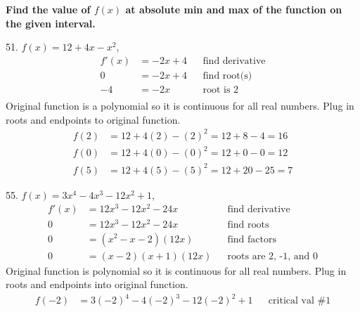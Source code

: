 \documentclass{article}
\begin{document}
\begin{description}
\begin{description}
          \end{description}
    \item\textbf{Find the value of $f(x)$ at absolute min and max of the function on the given interval.}
          \begin{description}
              \setlength\itemsep{3em}
              \item 51. $f(x) = 12 + 4x - x^2$, \space [0, 5]
                    \begin{align*}
                        f'(x) & = -2x + 4 &  & \text{find derivative} \\
                        0     & = -2x + 4 &  & \text{find root(s)}    \\
                        -4    & = -2x     &  & \text{root is 2}       \\
                    \end{align*}
                    Original function is a polynomial so it is continuous for all real numbers.
                    Plug in roots and endpoints to original function.
                    \begin{align*}
                        f(2) & = 12 + 4(2) - (2)^2 = 12 + 8 - 4 =  16 \\
                        f(0) & = 12 + 4(0) - (0)^2 = 12 + 0 - 0 = 12  \\
                        f(5) & = 12 + 4(5) - (5)^2 = 12 + 20 - 25 = 7
                    \end{align*}
              \item 55. $f(x) = 3x^4 - 4x^3 - 12x^2 + 1$, \space [-2, 3]
                    \begin{align*}
                        f'(x) & = 12x^3 - 12x^2 - 24x &  & \text{find derivative}        \\
                        0     & = 12x^3 - 12x^2 - 24x &  & \text{find roots}             \\
                        0     & = (x^2 - x - 2)(12x)  &  & \text{find factors}           \\
                        0     & = (x - 2)(x + 1)(12x) &  & \text{roots are 2, -1, and 0}
                    \end{align*}
                    Original function is polynomial so it is continuous for all real numbers. Plug in roots and endpoints into original function.
                    \begin{align*}
                        f(-2) & = 3(-2)^4 - 4(-2)^3 - 12(-2)^2 + 1 &  & \text{critical val \#1} \\

\end{align*}
\end{description}
\end{description}
\end{document}
